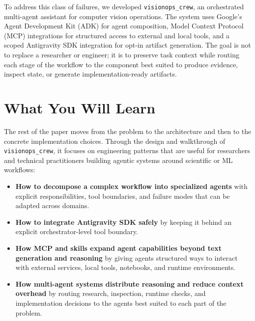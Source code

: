 \documentclass[11pt,a4paper]{article}
\begin{document}
To address this class of failures, we developed \texttt{visionops\_crew}, an orchestrated multi-agent assistant for computer vision operations. The system uses Google's Agent Development Kit (ADK) for agent composition, Model Context Protocol (MCP) integrations for structured access to external and local tools, and a scoped Antigravity SDK integration for opt-in artifact generation. The goal is not to replace a researcher or engineer; it is to preserve task context while routing each stage of the workflow to the component best suited to produce evidence, inspect state, or generate implementation-ready artifacts.

\section{What You Will Learn}
The rest of the paper moves from the problem to the architecture and then to the concrete implementation choices. Through the design and walkthrough of \texttt{visionops\_crew}, it focuses on engineering patterns that are useful for researchers and technical practitioners building agentic systems around scientific or ML workflows:
\begin{itemize}
    \item \textbf{How to decompose a complex workflow into specialized agents} with explicit responsibilities, tool boundaries, and failure modes that can be adapted across domains.
    \item \textbf{How to integrate Antigravity SDK safely} by keeping it behind an explicit orchestrator-level tool boundary.
    \item \textbf{How MCP and skills expand agent capabilities beyond text generation and reasoning} by giving agents structured ways to interact with external services, local tools, notebooks, and runtime environments.
    \item \textbf{How multi-agent systems distribute reasoning and reduce context overhead} by routing research, inspection, runtime checks, and implementation decisions to the agents best suited to each part of the problem.
\end{itemize}
\end{document}
